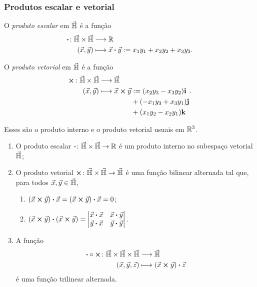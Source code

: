 \subsubsection{Produtos escalar e vetorial}

\begin{definition}
O \emph{produto escalar} em $\vec{\mathbb{H}}$ é a função
	\begin{align*}
	{\bm{\cdot}}\colon {\vec{\mathbb{H}} \times \vec{\mathbb{H}}} &\longrightarrow {\mathbb{R}} \\{(\vec{x},\vec{y})} &\longmapsto {\vec{x}} \bm{\cdot} {\vec{y}} := x_1y_1 + x_2y_2 + x_3y_3.
	\end{align*}

O \emph{produto vetorial} em $\vec{\mathbb{H}}$ é a função
	\begin{align*}
	{\bm{\times}}\colon {\vec{\mathbb{H}} \times \vec{\mathbb{H}}} &\longrightarrow {\vec{\mathbb{H}}} \\{(\vec{x},\vec{y})} &\longmapsto {\vec{x}} \bm{\times} {\vec{y}}
		\begin{aligned}[t]
		&:= (x_2y_3-x_3y_2)\bm{\mathrm{i}} \\
		&+ (-x_1y_3+x_3y_1)\bm{\mathrm{j}} \\
		&+ (x_1y_2-x_2y_1)\bm{\mathrm{k}}
		\end{aligned}
	.
	\end{align*}
\end{definition}

Esses são o produto interno e o produto vetorial usuais em $\mathbb{R}^3$.

\begin{exercise}
	\begin{enumerate}
	\item O produto escalar $\bm{\cdot}\colon \vec{\mathbb{H}} \times \vec{\mathbb{H}} \to \mathbb{R}$ é um produto interno no subespaço vetorial $\vec{\mathbb{H}}$;
	
	\item O produto vetorial $\bm{\times}\colon \vec{\mathbb{H}} \times \vec{\mathbb{H}} \to \vec{\mathbb{H}}$ é uma função bilinear alternada tal que, para todos $\vec{x},\vec{y} \in \vec{\mathbb{H}}$,
		\begin{enumerate}
		\item $
			{({\vec{x}} \bm{\times} {\vec{y}})} \bm{\cdot} {\vec{x}} = {({\vec{x}} \bm{\times} {\vec{y}})} \bm{\cdot} {\vec{x}} = 0$;
		
		\item ${({\vec{x}} \bm{\times} {\vec{y}})} \bm{\cdot} {({\vec{x}} \bm{\times} {\vec{y}})} =
				\begin{vmatrix}
				{\vec{x}} \bm{\cdot} {\vec{x}} & {\vec{x}} \bm{\cdot} {\vec{y}} \\ 
				{\vec{y}} \bm{\cdot} {\vec{x}} & {\vec{y}} \bm{\cdot} {\vec{y}}
				\end{vmatrix}$.
		\end{enumerate}
	
	\item A função
		\begin{align*}
		{\bm{\cdot} \circ \bm{\times}}\colon {\vec{\mathbb{H}} \times \vec{\mathbb{H}} \times \vec{\mathbb{H}}} &\longrightarrow {\vec{\mathbb{H}}} \\{(\vec{x},\vec{y},\vec{z})} &\longmapsto {({\vec{x}} \bm{\times} {\vec{y}})} \bm{\cdot} {\vec{z}}
		\end{align*}
é uma função trilinear alternada.
	\end{enumerate}
\end{exercise}


